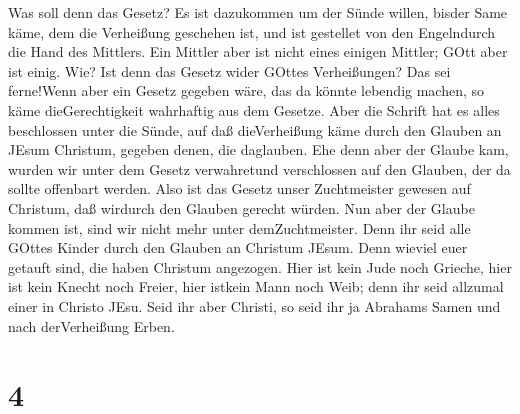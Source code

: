  Was soll denn das Gesetz? Es ist dazukommen um der Sünde
willen, bisder Same käme, dem die Verheißung geschehen ist, und ist
gestellet von den Engelndurch die Hand des Mittlers.  Ein
Mittler aber ist nicht eines einigen Mittler; GOtt aber ist einig.
 Wie? Ist denn das Gesetz wider GOttes Verheißungen? Das
sei ferne!Wenn aber ein Gesetz gegeben wäre, das da könnte lebendig
machen, so käme dieGerechtigkeit wahrhaftig aus dem Gesetze.
 Aber die Schrift hat es alles beschlossen unter die Sünde,
auf daß dieVerheißung käme durch den Glauben an JEsum Christum, gegeben
denen, die daglauben.  Ehe denn aber der Glaube kam, wurden
wir unter dem Gesetz verwahretund verschlossen auf den Glauben, der da
sollte offenbart werden.  Also ist das Gesetz unser
Zuchtmeister gewesen auf Christum, daß wirdurch den Glauben gerecht
würden.  Nun aber der Glaube kommen ist, sind wir nicht
mehr unter demZuchtmeister.  Denn ihr seid alle GOttes
Kinder durch den Glauben an Christum JEsum.  Denn wieviel
euer getauft sind, die haben Christum angezogen.  Hier ist
kein Jude noch Grieche, hier ist kein Knecht noch Freier, hier istkein
Mann noch Weib; denn ihr seid allzumal einer in Christo JEsu.
 Seid ihr aber Christi, so seid ihr ja Abrahams Samen und
nach derVerheißung Erben.

\hypertarget{section-2}{%
\section{4}\label{section-2}}

